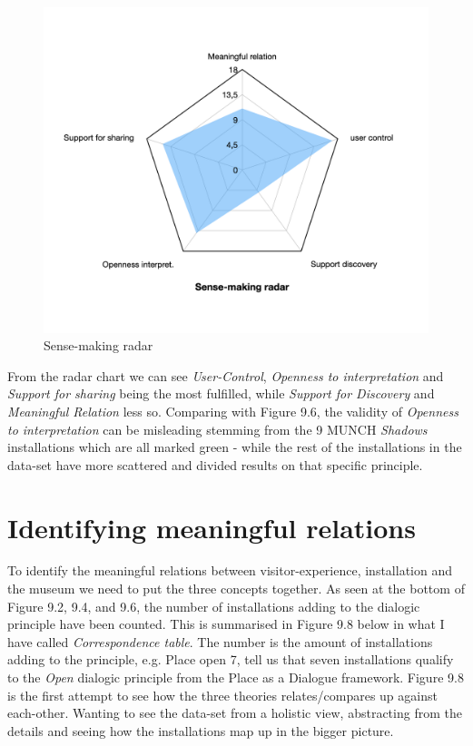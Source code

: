 \begin{figure}[H]
\includegraphics[width=12.5cm]{pictures/analysis/sense_radar.png}
\caption{Sense-making radar}
\centering 
\end{figure}

From the radar chart we can see \textit{User-Control}, \textit{Openness to interpretation} and \textit{Support for sharing} being the most fulfilled, while \textit{Support for Discovery} and \textit{Meaningful Relation} less so. Comparing with Figure 9.6, the validity of \textit{Openness to interpretation} can be misleading stemming from the 9 MUNCH \textit{Shadows} installations which are all marked green - while the rest of the installations in the data-set have more scattered and divided results on that specific principle.


\par
\section{Identifying meaningful relations}
To identify the meaningful relations between visitor-experience, installation and the museum we need to put the three concepts together. As seen at the bottom of Figure 9.2, 9.4, and 9.6, the number of installations adding to the dialogic principle have been counted. This is summarised in Figure 9.8 below in what I have called \emph{Correspondence table}. The number is the amount of installations adding to the principle, e.g. Place open 7, tell us that seven installations qualify to the \emph{Open} dialogic principle from the Place as a Dialogue framework. Figure 9.8 is the first attempt to see how the three theories relates/compares up against each-other. Wanting to see the data-set from a holistic view, abstracting from the details and seeing how the installations map up in the bigger picture.


